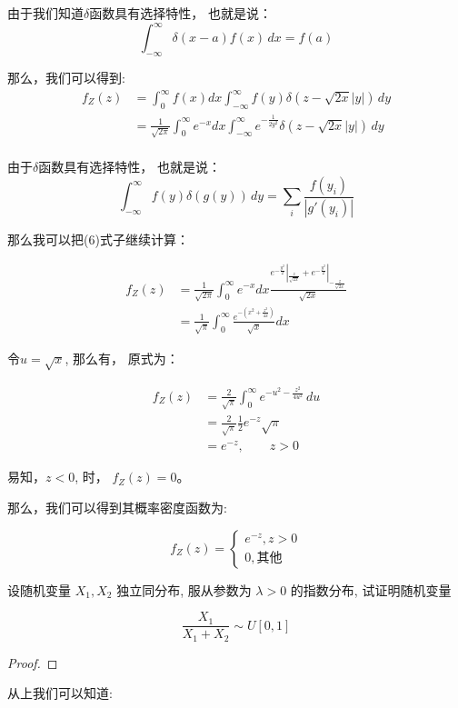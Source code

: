 \documentclass[a4,10pt]{ctexart}
\begin{document}
由于我们知道$\delta$函数具有选择特性， 也就是说：
\begin{equation}
    \int_{-\infty}^\infty \delta(x-a) f(x) \, dx = f(a)
\end{equation}

那么，我们可以得到:
\begin{align}
    f_Z(z) &= \int_0^\infty f(x) dx \int_{-\infty}^\infty f(y) \delta(z-\sqrt{2x}|y|) \, dy \\
    &= \frac{1}{\sqrt{2\pi}} \int_0^\infty e^{-x} dx \int_{-\infty}^\infty e^{-\frac{1}{2y^2}} \delta(z-\sqrt{2x}|y|) \, dy \\
\end{align}
    

由于$\delta$函数具有选择特性， 也就是说：
\begin{equation}
    \int_{-\infty}^{\infty} f(y) \delta(g(y)) \, dy = \sum_{i} \frac{f(y_i)}{|g'(y_i)|}
\end{equation}

那么我可以把(6)式子继续计算：

\begin{align}
    f_Z(z) &= \frac{1}{\sqrt{2\pi}} \int_0^\infty e^{-x} 
    dx \frac{e^{-\frac{y^2}{2}}|_{\frac{z}{\sqrt{2x}}}+e^ {-\frac{y^2}{2}}|_{-\frac{z}{\sqrt{2x}}}} {\sqrt{2x}}\\
    &=\frac{1}{\sqrt{\pi}} \int_0^\infty \frac{e^{-(x^2+\frac{z^2}{4x})}}{\sqrt{x}} dx 
    \end{align}


令$u=\sqrt{x}$, 那么有， 原式为：

\begin{align}
    f_Z(z) &= \frac{2}{\sqrt{\pi}} \int_0^\infty e^{-u^2-\frac{z^2}{4u^2}} \, du \\
    &= \frac{2}{\sqrt{\pi}} \frac{1}{2} e^{-z}\sqrt{\pi} \\
    & = e^{-z},\qquad z>0
    \end{align}

易知，$z<0$, 时， $f_Z(z)=0$。

那么，我们可以得到其概率密度函数为:

\begin{equation}
    f_Z(z) = \begin{cases}
        e^{-z}, z>0 \\
        0, \mbox{其他}
    \end{cases}
\end{equation}



    
    \begin{ti}{2}{}

    设随机变量 $X_1, X_2$ 独立同分布, 服从参数为 $\lambda>0$ 的指数分布, 试证明随机变量
    
    
    \begin{equation}
    \frac{X_1}{X_1+X_2} \sim U[0,1] 
   \end{equation}
    
\end{ti}
    \begin{proof}

    \end{proof}
    从上我们可以知道:
    
\end{document}
